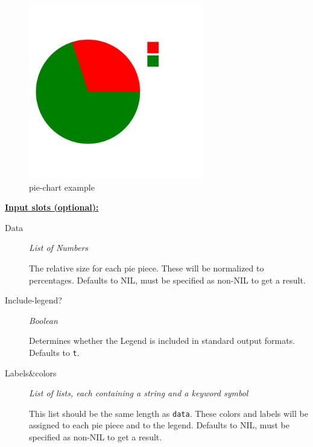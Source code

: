 \documentclass [11pt]{book}
\begin{document}
\begin{itemize}
\begin{figure}
\begin{center}
\includegraphics[width=3in,height=3in]{../images/example-pie-chart.pdf}
\end{center}

\caption{pie-chart example}

\label{fig:pie-chart}

\end{figure}





\textbf{
\underline{Input slots (optional):}}

\begin{description}

\item [Data]
\emph{List of Numbers}

 The relative size for each pie piece. These will be normalized to percentages.
Defaults to NIL, must be specified as non-NIL to get a result.




\item [Include-legend?]
\emph{Boolean}

 Determines whether the Legend is included in standard output formats. Defaults to \texttt{t}.




\item [Labels\&colors]
\emph{List of lists, each containing a string and a keyword symbol}

 This list should be the same
length as \texttt{data}. These colors and labels will be assigned to each pie piece and to the legend.
Defaults to NIL, must be specified as non-NIL to get a result.





\end{description}
\end{itemize}
\end{document}
